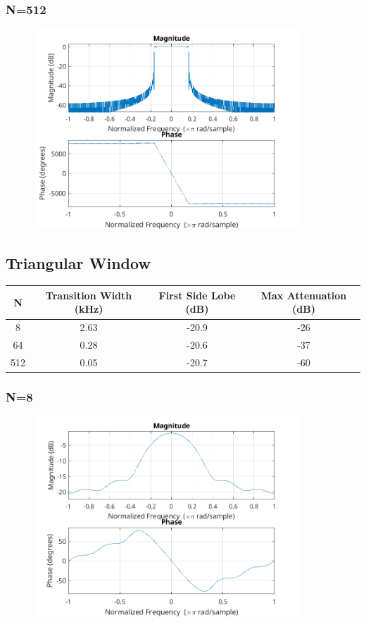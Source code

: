 \documentclass{article}
\begin{document}
  \subsubsection{N=512}
  \begin{figure}[!htb]
  \includegraphics[width=10cm]{freqz_rect_512.png}
  \end{figure}
\subsection{Triangular Window}
\begin{center}
\begin{tabular}{||c c c c||} 
 \hline
 N & Transition Width (kHz) & First Side Lobe (dB) & Max Attenuation (dB)\\ [0.5ex] 
 \hline\hline
 8 & 2.63 & -20.9 & -26 \\ 
 64 & 0.28 & -20.6 & -37 \\
 512 & 0.05 & -20.7 & -60 \\   
 \hline
\end{tabular}
\end{center}

  \subsubsection{N=8}
  \begin{figure}[!htb]
  \includegraphics[width=10cm]{freqz_tri_8.png}
  \end{figure}
\end{document}
